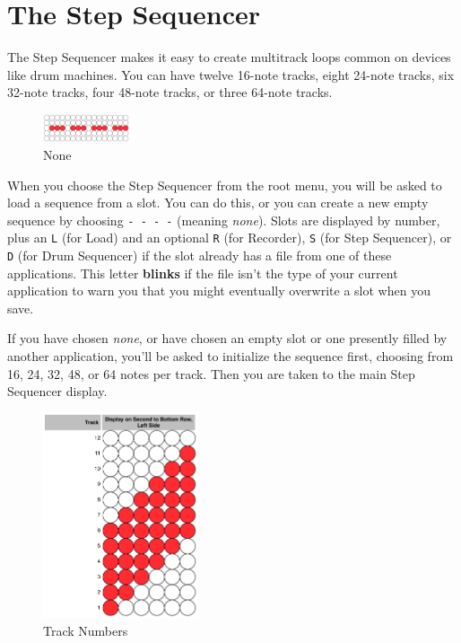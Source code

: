 \documentclass{article}
\begin{document}
\section {The Step Sequencer}
\label{stepsequencersec}

The Step Sequencer makes it easy to create multitrack loops common on devices like drum machines.  You can have twelve 16-note tracks, eight 24-note tracks, six 32-note tracks, four 48-note tracks, or three 64-note tracks.

\begin{figure}
\vspace{-1em}\includegraphics[width=1in]{none.pdf}
\vspace{-2em}\caption{\small None}\vspace{-1em}
\label{none}
\end{figure}

When you choose the Step Sequencer from the root menu, you will be asked to load a sequence from a slot.  You can do this, or you can create a new empty sequence by choosing \texttt{-~-~-~-} (meaning {\it none}).  Slots are displayed by number, plus an \texttt{L} (for Load) and an optional \texttt{R} (for Recorder), \texttt{S} (for Step Sequencer), or \texttt{D} (for Drum Sequencer) if the slot already has a file from one of these applications.  This letter {\bf blinks} if the file isn't the type of your current application to warn you that you might eventually overwrite a slot when you save.

If you have chosen {\it none}, or have chosen an empty slot or one presently filled by another application, you'll be asked to initialize the sequence first, choosing from 16, 24, 32, 48, or 64 notes per track. Then you are taken to the main Step Sequencer display.  

\begin{figure}
\includegraphics[width=1.8in]{track.pdf}
\vspace{-2em}\caption{\small Track Numbers}
\label{tracknumber}
\end{figure}
\end{document}
